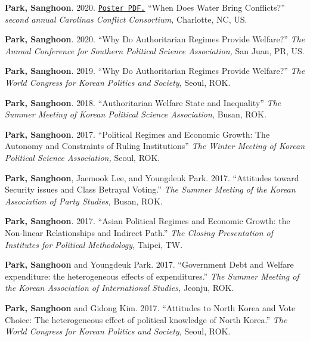 \documentclass[margin,line]{res}
\begin{document}
\begin{resume}
\vspace{-.25cm}
{\bf Park, Sanghoon}. {2020.} \href{https://www.dropbox.com/s/7xr90ielm1vh1sd/poster.pdf?dl=0}{\tt Poster PDF.} {``When Does Water Bring Conflicts?''} {\it second annual Carolinas Conflict Consortium,} Charlotte, NC, US.

\vspace{-.25cm}
{\bf Park, Sanghoon}. {2020.} {``Why Do Authoritarian Regimes Provide Welfare?''} {\it The Annual Conference for Southern Political Science Association,} San Juan, PR, US.

\vspace{-.25cm}
{\bf Park, Sanghoon}. {2019.} {``Why Do Authoritarian Regimes Provide Welfare?''} {\it The World Congress for Korean Politics and Society,} Seoul, ROK.

\vspace{-.25cm}
{\bf Park, Sanghoon}. {2018.} {``Authoritarian Welfare State and Inequality''} {\it The Summer Meeting of Korean Political Science Association,} Busan, ROK.

\vspace{-.25cm}
{\bf Park, Sanghoon}. {2017.} {``Political Regimes and Economic Growth: The Autonomy and Constraints of Ruling Institutions''} {\it The Winter Meeting of Korean Political Science Association,} Seoul, ROK.

\vspace{-.25cm}
{\bf Park, Sanghoon}, Jaemook Lee, and Youngdeuk Park. {2017.} {``Attitudes toward Security issues and Class Betrayal Voting.''} {\it The Summer Meeting of the Korean Association of Party Studies,} Busan, ROK.

\vspace{-.25cm}
{\bf Park, Sanghoon}. {2017.} {``Asian Political Regimes and Economic Growth: the Non-linear Relationships and Indirect Path.''} {\it The Closing Presentation of Institutes for Political Methodology,} Taipei, TW.

\vspace{-.25cm}
{\bf Park, Sanghoon} and Youngdeuk Park. {2017.} {``Government Debt and Welfare expenditure: the heterogeneous effects of expenditures.''} {\it The Summer Meeting of the Korean Association of International Studies,} Jeonju, ROK.

\vspace{-.25cm}
{\bf Park, Sanghoon} and Gidong Kim. {2017.} {``Attitudes to North Korea and Vote Choice: The heterogeneous effect of political knowledge of North Korea.''} {\it The World Congress for Korean Politics and Society,} Seoul, ROK.


\end{resume}
\end{document}
